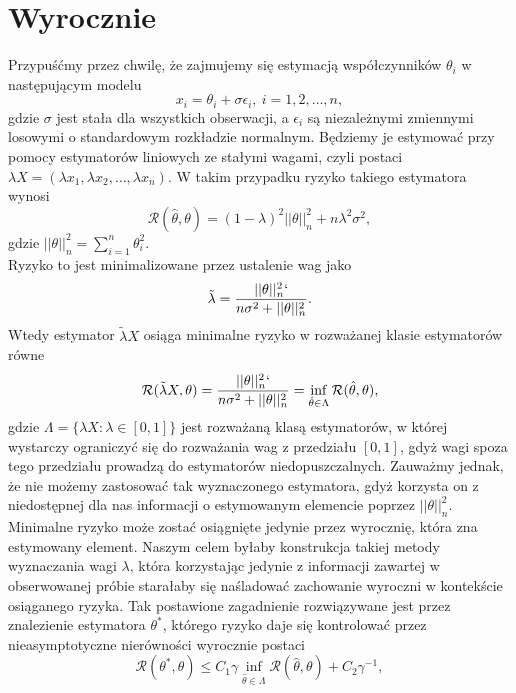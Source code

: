 \documentclass{article}
\begin{document}
\section{Wyrocznie}
Przypuśćmy przez chwilę, że zajmujemy się estymacją współczynników $\theta_i$ w następującym modelu 
\begin{displaymath}
x_i=\theta_i+\sigma\epsilon_i,\ i=1,2,\dots,n,
\end{displaymath}
gdzie $\sigma$ jest stała dla wszystkich obserwacji, a $\epsilon_i$ są niezależnymi zmiennymi losowymi o standardowym rozkładzie normalnym. Będziemy je estymować przy pomocy estymatorów liniowych ze stałymi wagami, czyli postaci $\lambda X=(\lambda x_1,\lambda x_2,\dots, \lambda x_n)$. W takim przypadku ryzyko takiego estymatora wynosi 
\begin{displaymath}
\mathcal{R}(\hat{\theta},\theta)=(1-\lambda)^2||\theta||^2_n+n\lambda^2\sigma^2,
\end{displaymath}
gdzie $||\theta||_n^2=\sum_{i=1}^n\theta_i^2$.\\
Ryzyko to jest minimalizowane przez ustalenie wag jako
\begin{displaymath}
\tilde{\lambda}=\frac{||\theta||^2_n`}{n\sigma^2+||\theta||^2_n}.
\end{displaymath}
Wtedy estymator $\tilde{\lambda}X$ osiąga minimalne ryzyko w rozważanej klasie estymatorów równe
\begin{displaymath}
\mathcal{R}(\tilde{\lambda}X,\theta)=\frac{||\theta||^2_n`}{n\sigma^2+||\theta||^2_n}=\inf_{\hat{\theta} \in \Lambda}\mathcal{R}(\hat{\theta},\theta),
\end{displaymath}
gdzie $\Lambda=\{\lambda X\colon \lambda\in [0,1]\}$ jest rozważaną klasą estymatorów, w której wystarczy ograniczyć się do rozważania wag z przedziału $[0,1]$, gdyż wagi spoza tego przedziału prowadzą do estymatorów niedopuszczalnych. Zauważmy jednak, że nie możemy zastosować tak wyznaczonego estymatora, gdyż korzysta on z niedostępnej dla nas informacji o estymowanym elemencie poprzez $||\theta||_n^2$. Minimalne ryzyko może zostać osiągnięte jedynie przez wyrocznię, która zna estymowany element. Naszym celem byłaby konstrukcja takiej metody wyznaczania wagi $\lambda$, która korzystając jedynie z informacji zawartej w obserwowanej próbie starałaby się naśladować zachowanie wyroczni w kontekście osiąganego ryzyka. Tak postawione zagadnienie rozwiązywane jest przez znalezienie estymatora $\theta^*$, którego ryzyko daje się kontrolować przez nieasymptotyczne nierówności wyrocznie postaci 
\begin{equation}\label{oracle}
\mathcal{R}(\theta^*,\theta)\leq C_1\gamma \inf_{\hat{\theta} \in \Lambda}\mathcal{R}(\hat{\theta},\theta)+C_2\gamma^{-1}, 
\end{equation}
\end{document}
